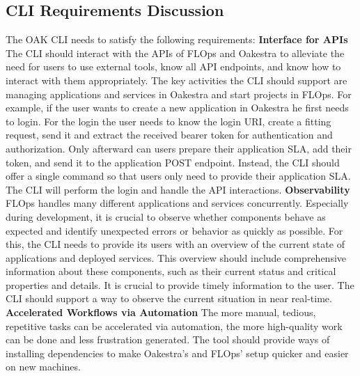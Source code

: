 \subsection{CLI Requirements Discussion}

The OAK CLI needs to satisfy the following requirements:
\vspace{5mm}
\newline
\textbf{Interface for APIs}\newline
The CLI should interact with the APIs of FLOps and Oakestra to alleviate the need for users to use external tools, know all API endpoints, and know how to interact with them appropriately.
The key activities the CLI should support are managing applications and services in Oakestra and start projects in FLOps.
For example, if the user wants to create a new application in Oakestra he first needs to login.
For the login the user needs to know the login URI, create a fitting request, send it and extract the received bearer token for authentication and authorization.
Only afterward can users prepare their application SLA, add their token, and send it to the application POST endpoint.
Instead, the CLI should offer a single command so that users only need to provide their application SLA. 
The CLI will perform the login and handle the API interactions.
\vspace{5mm}
\newline
\textbf{Observability}\newline
FLOps handles many different applications and services concurrently.
Especially during development, it is crucial to observe whether components behave as expected and identify unexpected errors or behavior as quickly as possible.
For this, the CLI needs to provide its users with an overview of the current state of applications and deployed services.
This overview should include comprehensive information about these components, such as their current status and critical properties and details.
It is crucial to provide timely information to the user.
The CLI should support a way to observe the current situation in near real-time.
\vspace{5mm}
\newline
\textbf{Accelerated Workflows via Automation}\newline
The more manual, tedious, repetitive tasks can be accelerated via automation, the more high-quality work can be done and less frustration generated.
The tool should provide ways of installing dependencies to make Oakestra's and FLOps' setup quicker and easier on new machines.
